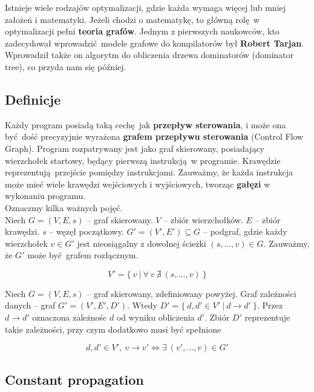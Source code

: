 \documentclass[leqno, 12pt]{article}
\newcommand{\spacing}{\vskip 0.5cm}
\begin{document}
		Istnieje wiele rodzajów optymalizacji, gdzie każda wymaga więcej lub mniej założeń i
		matematyki. Jeżeli chodzi o matematykę, to główną rolę w optymalizacji pełni \textbf{teoria grafów}.
		Jednym z pierwszych naukowców, kto zadecydował wprowadzić modele grafowe do kompilatorów był
		\textbf{Robert Tarjan}. Wprowadził także on algorytm do obliczenia drzewa dominatorów (dominator tree),
		co przyda nam się później.

		\subsection{Definicje}
			Każdy program posiadą taką cechę jak \textbf{przepływ sterowania}, i może ona być dość
			precyzyjnie wyrażona \textbf{grafem przepływu sterowania} (Control Flow Graph). Program
			rozpatrywany jest jako graf skierowany, posiadający wierzchołek startowy, będący pierwszą
			instrukcją w programie. Krawędzie reprezentują przejście pomiędzy instrukcjami. Zauważmy,
			że każda instrukcja może mieć wiele krawędzi wejściowych i wyjściowych, tworząc \textbf{gałęzi}
			w wykonaniu programu.
			\\
			
			Oznaczmy kilka ważnych pojęć.
			\\

			Niech $G = (V, E, s)$ -- graf skierowany.
			$V$ -- zbiór wierzchołków. $E$ -- zbiór krawędzi. $s$ -- węzęł początkowy.
			$G' = (V', E') \subseteq G$ -- podgraf, gdzie każdy wierzchołek $v \in G'$ jest nieosiągalny z
			dowolnej ścieżki $(s, ...,  v) \in G$. Zauważmy, że $G'$ może być grafem rozłącznym.

			$$V' = \{ \ v \ | \ \forall \ v \ \nexists \ (s, ..., v) \ \}$$

			\spacing

			Niech $G = (V, E, s)$ -- graf skierowany, zdefiniowany powyżej. Graf zależności danych -- graf
			$G' = (V', E', D')$. Wtedy $D' = \{ \ d, d' \in V' \ | \ d \rightarrow d' \ \}$. Przez $d \rightarrow d'$
			oznaczona zależnośc $d$ od wyniku obliczenia $d'$. Zbiór $D'$ reprezentuje takie zależności, przy czym
			dodatkowo musi być spełnione

			$$d, d' \in V', \ v \rightarrow v' \iff \exists \ (v', ..., v) \in G' $$
	
		\subsection{Constant propagation}
		
\end{document}
